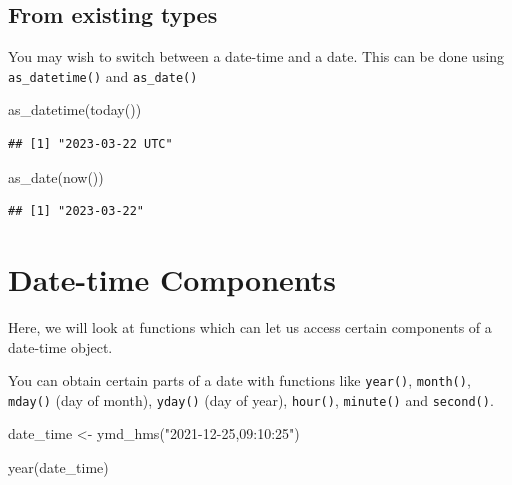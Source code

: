 \documentclass[
]{book}
\newenvironment{Shaded}{\begin{snugshade}}{\end{snugshade}}
\newcommand{\FunctionTok}[1]{\textcolor[rgb]{0.00,0.00,0.00}{#1}}
\newcommand{\NormalTok}[1]{#1}
\newcommand{\OtherTok}[1]{\textcolor[rgb]{0.56,0.35,0.01}{#1}}
\newcommand{\StringTok}[1]{\textcolor[rgb]{0.31,0.60,0.02}{#1}}
\begin{document}
\hypertarget{from-existing-types}{%
\subsection{From existing types}\label{from-existing-types}}

You may wish to switch between a date-time and a date. This can be done using \texttt{as\_datetime()} and \texttt{as\_date()}

\begin{Shaded}
\begin{Highlighting}[]
\FunctionTok{as\_datetime}\NormalTok{(}\FunctionTok{today}\NormalTok{())}
\end{Highlighting}
\end{Shaded}

\begin{verbatim}
## [1] "2023-03-22 UTC"
\end{verbatim}

\begin{Shaded}
\begin{Highlighting}[]
\FunctionTok{as\_date}\NormalTok{(}\FunctionTok{now}\NormalTok{())}
\end{Highlighting}
\end{Shaded}

\begin{verbatim}
## [1] "2023-03-22"
\end{verbatim}

\hypertarget{date-time-components}{%
\section{Date-time Components}\label{date-time-components}}

Here, we will look at functions which can let us access certain components of a date-time object.

You can obtain certain parts of a date with functions like \texttt{year()}, \texttt{month()}, \texttt{mday()} (day of month), \texttt{yday()} (day of year), \texttt{hour()}, \texttt{minute()} and \texttt{second()}.

\begin{Shaded}
\begin{Highlighting}[]
\NormalTok{date\_time }\OtherTok{\textless{}{-}} \FunctionTok{ymd\_hms}\NormalTok{(}\StringTok{"2021{-}12{-}25,09:10:25"}\NormalTok{)}

\FunctionTok{year}\NormalTok{(date\_time)}
\end{Highlighting}
\end{Shaded}
\end{document}
